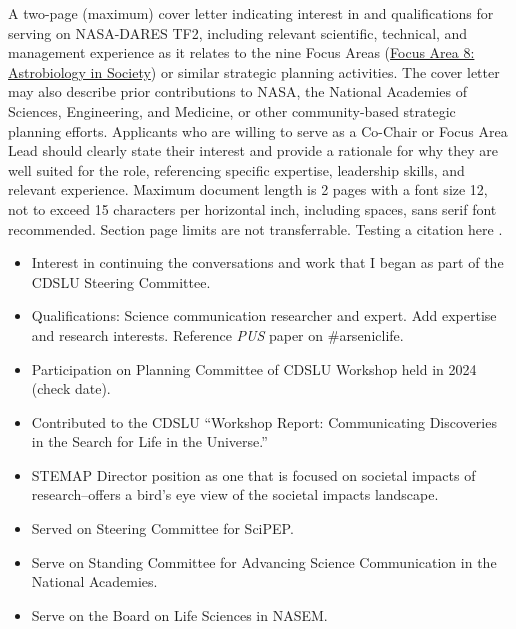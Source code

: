 \documentclass[12pt]{article}
\begin{document}
% 

A two-page (maximum) cover letter indicating interest in and qualifications for serving on NASA-DARES TF2, including relevant scientific, technical, and management experience as it relates to the nine Focus Areas (\href{https://assets.science.nasa.gov/content/dam/science/psd/astrobiology/for-researchers/dares/9.%20Astrobiology%20in%20Society.pdf}{Focus Area 8: Astrobiology in Society}) or similar strategic planning activities. The cover letter may also describe prior contributions to NASA, the National Academies of Sciences, Engineering, and Medicine, or other community-based strategic planning efforts. Applicants who are willing to serve as a Co-Chair or Focus Area Lead should clearly state their interest and provide a rationale for why they are well suited for the role, referencing specific expertise, leadership skills, and relevant experience. Maximum document length is 2 pages with a font size 12, not to exceed 15 characters per horizontal inch, including spaces, sans serif font recommended. Section page limits are not transferrable. Testing a citation here \parencite{yeoHumorCanIncrease2022}.

\begin{itemize}
    \item Interest in continuing the conversations and work that I began as part of the CDSLU Steering Committee.
    \item Qualifications: Science communication researcher and expert. Add expertise and research interests. Reference \textit{PUS} paper on \#arseniclife.
    \item Participation on Planning Committee of CDSLU Workshop held in 2024 (check date).
    \item Contributed to the CDSLU ``Workshop Report: Communicating Discoveries in the Search for Life in the Universe.''
    \item STEMAP Director position as one that is focused on societal impacts of research--offers a bird's eye view of the societal impacts landscape.
    \item Served on Steering Committee for SciPEP.
    \item Serve on Standing Committee for Advancing Science Communication in the National Academies.
    \item Serve on the Board on Life Sciences in NASEM.
\end{itemize}

\newpage

\printbibliography
\end{document}
